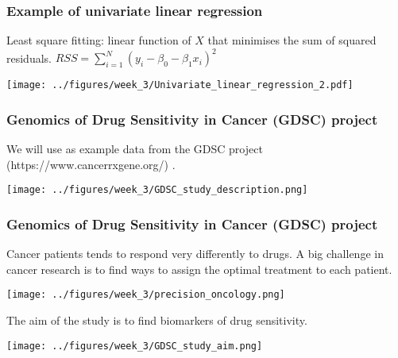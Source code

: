 \documentclass[notes]{beamer}          %
\begin{document}
\begin{frame}
\frametitle{Example of univariate linear regression}
Least square fitting: linear function of $X$ that minimises the sum of squared residuals. $RSS = \sum_{i=1}^N (y_i - \beta_0 - \beta_1 x_i)^2$

\begin{center}
\texttt{[image: ../figures/week\_3/Univariate\_linear\_regression\_2.pdf]}
\end{center}

\end{frame}

\begin{frame}
\frametitle{Genomics of Drug Sensitivity in Cancer (GDSC) project}
We will use as example data from the GDSC project (https://www.cancerrxgene.org/) \cite{GDSC}.

\begin{center}
\texttt{[image: ../figures/week\_3/GDSC\_study\_description.png]}
\end{center}

\end{frame}

\begin{frame}
\frametitle{Genomics of Drug Sensitivity in Cancer (GDSC) project}
Cancer patients tends to respond very differently to drugs. A big challenge in cancer research 
is to find ways to assign the optimal treatment to each patient.

\begin{center}
\texttt{[image: ../figures/week\_3/precision\_oncology.png]}
\end{center}

The aim of the study is to find biomarkers of drug sensitivity.

\begin{center}
\texttt{[image: ../figures/week\_3/GDSC\_study\_aim.png]}
\end{center}

\end{frame}
\end{document}
